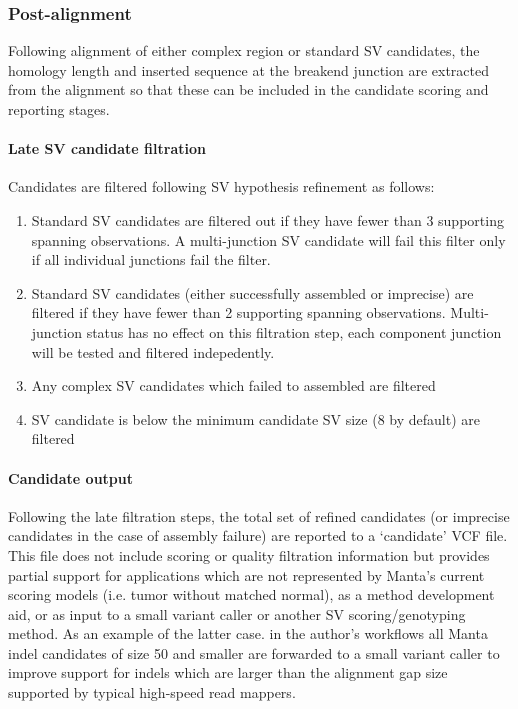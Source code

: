 \documentclass{article}
\begin{document}
\subsubsection{Post-alignment}
Following alignment of either complex region or standard SV candidates, the homology length and inserted sequence at the breakend junction are extracted from the alignment so that these can be included in the candidate scoring and reporting stages.

\paragraph{Late SV candidate filtration}

Candidates are filtered following SV hypothesis refinement as follows:

\begin{enumerate}
    \item Standard SV candidates are filtered out if they have fewer than 3 supporting spanning observations. A multi-junction SV candidate will fail this filter only if all individual junctions fail the filter.
    \item Standard SV candidates (either successfully assembled or imprecise) are filtered if they have fewer than 2 supporting spanning observations. Multi-junction status has no effect on this filtration step, each component junction will be tested and filtered indepedently.
    \item Any complex SV candidates which failed to assembled are filtered
    \item SV candidate is below the minimum candidate SV size (8 by default) are filtered
\end{enumerate}

\paragraph{Candidate output}

Following the late filtration steps, the total set of refined candidates (or imprecise candidates in the case of assembly failure) are reported to a `candidate' VCF file. This file does not include scoring or quality filtration information but provides partial support for applications which are not represented by Manta's current scoring models (i.e. tumor without matched normal), as a method development aid, or as input to a small variant caller or another SV scoring/genotyping method. As an example of the latter case. in the author's workflows all Manta indel candidates of size 50 and smaller are forwarded to a small variant caller to improve support for indels which are larger than the alignment gap size supported by typical high-speed read mappers.
\end{document}
